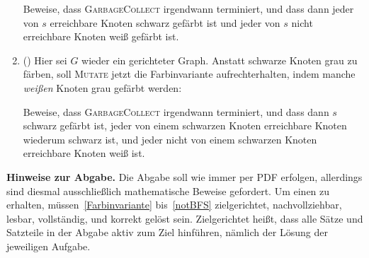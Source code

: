 \documentclass{uebung_cs}
\newcommand{\fett}[1]{\textbf{\boldmath\color{red!60!black}#1}}
\begin{document}
\begin{enumerate}
        Beweise, dass \textsc{GarbageCollect} irgendwann terminiert, und dass dann jeder von $s$ erreichbare Knoten schwarz gefärbt ist und jeder von $s$ nicht erreichbare Knoten weiß gefärbt ist.
    \item (\veryhard) Hier sei $G$ wieder ein gerichteter Graph. Anstatt schwarze Knoten grau zu färben, soll \textsc{Mutate} jetzt die Farbinvariante aufrechterhalten, indem manche \emph{weißen} Knoten grau gefärbt werden:
    \begin{algorithmic}
            \State{\fett{färbe $w$ grau}}
            \EndIf{}
            \State{\fett{färbe $u$ grau}}
            \EndIf{}
        \EndIf{}
        \EndProcedure{}
    \end{algorithmic}
    Beweise, dass \textsc{GarbageCollect} irgendwann terminiert, und dass dann $s$ schwarz gefärbt ist, jeder von einem schwarzen Knoten erreichbare Knoten wiederum schwarz ist, und jeder nicht von einem schwarzen Knoten erreichbare Knoten weiß ist.
\end{enumerate}

\textbf{Hinweise zur Abgabe.}
Die Abgabe soll wie immer per PDF erfolgen, allerdings sind diesmal ausschließlich mathematische Beweise gefordert. Um einen  zu erhalten, müssen~\ref{Farbinvariante} bis~\ref{notBFS} zielgerichtet, nachvollziehbar, lesbar, vollständig, und korrekt gelöst sein.
Zielgerichtet heißt, dass alle Sätze und Satzteile in der Abgabe aktiv zum Ziel hinführen, nämlich der Lösung der jeweiligen Aufgabe.
\end{document}
